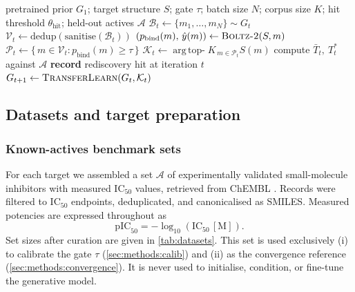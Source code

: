 \documentclass[11pt]{article}
\newcommand{\pbind}{p_{\mathrm{bind}}}          %
\newcommand{\yhat}{\hat{y}}                     %
\newcommand{\ICfifty}{\mathrm{IC}_{50}}
\newcommand{\pICfifty}{\mathrm{pIC}_{50}}
\newcommand{\Gmodel}{G}                         %
\newcommand{\Actives}{\mathcal{A}}              %
\newcommand{\Batch}{\mathcal{B}}                %
\newcommand{\Valid}{\mathcal{V}}                %
\newcommand{\Passed}{\mathcal{P}}               %
\newcommand{\TopK}{\mathcal{K}}                 %
\newcommand{\thetahit}{\theta_{\mathrm{hit}}}
\newcommand{\Tbar}{\bar{T}}
\newcommand{\Tstar}{T^{*}}
\newcommand{\Ngen}{N}
\newcommand{\Kk}{K}
\begin{document}
\begin{algorithm}[t]
\caption{Closed-loop generative optimisation for one target}
\label{alg:loop}
\begin{algorithmic}[1]
\Require pretrained prior $\Gmodel_1$; target structure $S$; gate $\tau$;
         batch size $\Ngen$; corpus size $\Kk$; hit threshold $\thetahit$;
         held-out actives $\Actives$
  \State $\Batch_t \gets \{m_1,\dots,m_\Ngen\} \sim \Gmodel_t$
  \State $\Valid_t \gets \mathrm{dedup}(\mathrm{sanitise}(\Batch_t))$
  \ForAll{$m \in \Valid_t$}
    \State $(\pbind(m),\, \yhat(m)) \gets \textsc{Boltz-2}(S, m)$
  \EndFor
  \State $\Passed_t \gets \{\, m \in \Valid_t : \pbind(m) \ge \tau \,\}$
  \State $\TopK_t \gets \operatorname*{arg\,top-}\Kk_{\,m \in \Passed_t} S(m)$
  \State compute $\Tbar_t,\ \Tstar_t$ against $\Actives$
  \If{$\Tstar_t \ge \thetahit$}
    \State \textbf{record} rediscovery hit at iteration $t$
  \EndIf
  \State $\Gmodel_{t+1} \gets \textsc{TransferLearn}(\Gmodel_t, \TopK_t)$
\EndFor
\end{algorithmic}
\end{algorithm}

\subsection{Datasets and target preparation}
\label{sec:methods:data}

\subsubsection{Known-actives benchmark sets}

For each target we assembled a set $\Actives$ of experimentally validated
small-molecule inhibitors with measured $\ICfifty$ values, retrieved from
ChEMBL \citep{zdrazil2024}. Records were filtered to $\ICfifty$ endpoints,
deduplicated, and canonicalised as SMILES. Measured potencies are expressed
throughout as
\begin{equation}
  \pICfifty = -\log_{10}\!\left(\ICfifty\,[\mathrm{M}]\right).
  \label{eq:pic50}
\end{equation}
Set sizes after curation are given in \cref{tab:datasets}. This set is used
exclusively (i) to calibrate the gate $\tau$ (\cref{sec:methods:calib}) and
(ii) as the convergence reference (\cref{sec:methods:convergence}). It is never
used to initialise, condition, or fine-tune the generative model.
\end{document}

